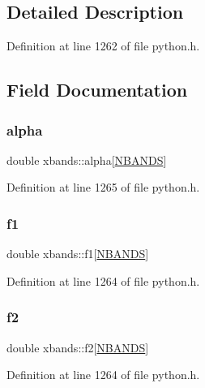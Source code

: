 \subsection{Detailed Description}


Definition at line 1262 of file python.\+h.



\subsection{Field Documentation}
\mbox{\label{structxbands_a5fd1368571f38469e4b8f5ad19586279}} 
\subsubsection{\texorpdfstring{alpha}{alpha}}
{\footnotesize\ttfamily double xbands\+::alpha\mbox{[}\hyperlink{python_8h_a46ee023ac3f5d103e533843238d2e52a}{N\+B\+A\+N\+DS}\mbox{]}}



Definition at line 1265 of file python.\+h.

\mbox{\label{structxbands_a4822266ca02ed8a4b214e5efcd79256c}} 
\subsubsection{\texorpdfstring{f1}{f1}}
{\footnotesize\ttfamily double xbands\+::f1\mbox{[}\hyperlink{python_8h_a46ee023ac3f5d103e533843238d2e52a}{N\+B\+A\+N\+DS}\mbox{]}}



Definition at line 1264 of file python.\+h.

\mbox{\label{structxbands_af398da6fd226bb4257ad64ac9704098a}} 
\subsubsection{\texorpdfstring{f2}{f2}}
{\footnotesize\ttfamily double xbands\+::f2\mbox{[}\hyperlink{python_8h_a46ee023ac3f5d103e533843238d2e52a}{N\+B\+A\+N\+DS}\mbox{]}}



Definition at line 1264 of file python.\+h.

